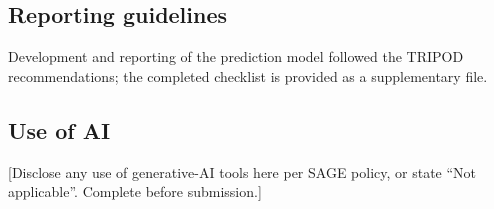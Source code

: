 \documentclass[11pt]{article}
\begin{document}
\subsection*{Reporting guidelines}
Development and reporting of the prediction model followed the TRIPOD
recommendations; the completed checklist is provided as a supplementary file.

\subsection*{Use of AI}
[Disclose any use of generative-AI tools here per SAGE policy, or state
``Not applicable''. Complete before submission.]
\end{document}
